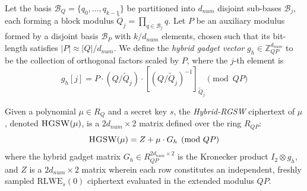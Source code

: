 \begin{definition}
    \label{def:hybrid-rgsw}
    Let the basis $\mathcal{B}_Q = \{q_0, \dots, q_{k-1}\}$ be partitioned into $d_{num}$ disjoint sub-bases $\mathcal{B}_j$, each forming a block modulus $\tilde{Q}_j = \prod_{q \in \mathcal{B}_j} q$. Let $P$ be an auxiliary modulus formed by a disjoint basis $\mathcal{B}_P$ with $k/d_{num}$ elements, chosen such that its bit-length satisfies $|P| \approx |Q|/d_{num}$. 
    We define the \emph{hybrid gadget vector} ${g}_{h} \in \mathbb{Z}_{QP}^{d_{num}}$ to be the collection of orthogonal factors scaled by $P$, where the $j$-th element is
    \begin{equation}
        \label{eq:hgsw:qh}
        {g_h}[j] = P \cdot (Q / \tilde{Q}_j)\cdot [(Q/\tilde{Q}_j)^{-1}]_{\tilde{Q}_j} \pmod{QP}
    \end{equation}

    \newpage
    Given a polynomial $\mu \in R_Q$ and a secret key $s$, the \emph{Hybrid-RGSW} ciphertext of $\mu$, denoted $\Call{HGSW}{\mu}$, is a $2 d_{num} \times 2$ matrix defined over the ring $R_{QP}$:
    \begin{equation}
        \label{eq:hybrid-rgsw}
        \Call{HGSW}{\mu} = Z + \mu \cdot G_{h} \pmod{QP}
    \end{equation}
    where the hybrid gadget matrix $G_{h} \in R_{QP}^{2 d_{num} \times 2}$ is the Kronecker product $I_2 \otimes {g}_{h}$, and $Z$ is a $2 d_{num} \times 2$ matrix wherein each row constitutes an independent, freshly sampled $\text{RLWE}_s(0)$ ciphertext evaluated in the extended modulus $QP$.
\end{definition}


